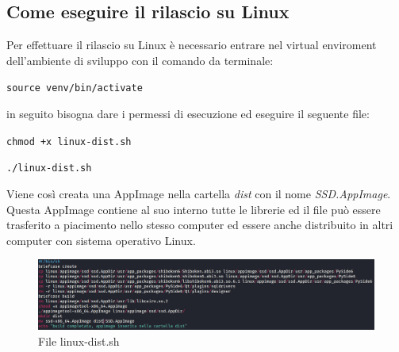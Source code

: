 \subsection{Come eseguire il rilascio su Linux}
Per effettuare il rilascio su Linux è necessario entrare nel virtual enviroment dell'ambiente di sviluppo con il comando da terminale:
\newline{}\centerline{\texttt{source venv/bin/activate}}\newline{}
in seguito bisogna dare i permessi di esecuzione ed eseguire il seguente file:
\newline{}\centerline{\texttt{chmod +x linux-dist.sh}}
\newline{}\centerline{\texttt{./linux-dist.sh}}\newline{}
Viene così creata una AppImage nella cartella \textit{dist} con il nome \textit{SSD.AppImage}. \\
Questa AppImage contiene al suo interno tutte le librerie ed il file può essere trasferito a piacimento nello stesso computer ed essere anche distribuito in altri computer con sistema operativo Linux.
\begin{figure}[H]
    \centering
    \includegraphics[scale = 0.2]{components/img/linux-deploy-script.png}
    \caption{File linux-dist.sh}
    \label{fig:File linux-dist.bat}
\end{figure}

